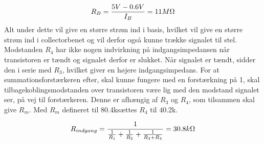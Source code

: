 \begin{equation}
R_B = \frac{5 V-0.6V}{I_B} =  11M\ohm
\end{equation}
Alt under dette vil give en større strøm ind i basis, hvilket vil give en større strøm ind i collectorbenet og vil derfor også kunne trække signalet til stel.
Modstanden $R_4$ har ikke nogen indvirkning på indgangsimpedansen når transistoren er tændt og signalet derfor er slukket. Når signalet er tændt, sidder den i serie med $R_3$, hvilket giver en højere indgangsimpedans. For at summationsforstærkeren efter, skal kunne fungere med en forstærkning på 1, skal tilbagekoblingsmodstanden over transistoren være lig med den modstand signalet ser, på vej til forstærkeren. Denne er afhængig af $R_3$ og $R_4$, som tilsammen skal give $R_m$. Med $R_m$ defineret til 80.4k\ohm sættes $R_4$ til 40.2k\ohm .

\begin{equation}
R_{indgang}=\frac{1}{\frac{1}{R_1}+\frac{1}{R_2}+\frac{1}{R_3+R_4}}=30.8 k\ohm
\end{equation}

